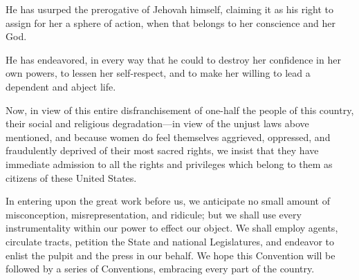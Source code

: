 \documentclass{article}
\begin{document}
He has usurped the prerogative of Jehovah himself, claiming it as his right to
assign for her a sphere of action, when that belongs to her conscience and her
God.

He has endeavored, in every way that he could to destroy her confidence in her
own powers, to lessen her self-respect, and to make her willing to lead a
dependent and abject life.

Now, in view of this entire disfranchisement of one-half the people of this
country, their social and religious degradation—in view of the unjust laws
above mentioned, and because women do feel themselves aggrieved, oppressed, and
fraudulently deprived of their most sacred rights, we insist that they have
immediate admission to all the rights and privileges which belong to them as
citizens of these United States.

In entering upon the great work before us, we anticipate no small amount of
misconception, misrepresentation, and ridicule; but we shall use every
instrumentality within our power to effect our object. We shall employ agents,
circulate tracts, petition the State and national Legislatures, and endeavor to
enlist the pulpit and the press in our behalf. We hope this Convention will be
followed by a series of Conventions, embracing every part of the country.
\end{document}
